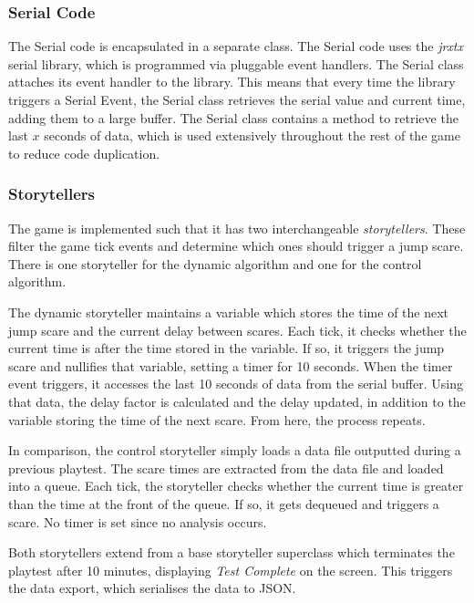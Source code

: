 \documentclass[12pt,a4paper]{article}\usepackage[]{graphicx}\usepackage[]{color}
\begin{document}
\subsubsection{Serial Code}
The Serial code is encapsulated in a separate class.
The Serial code uses the \emph{jrxtx} serial library, which is programmed via pluggable event handlers.
The Serial class attaches its event handler to the library.
This means that every time the library triggers a Serial Event, the Serial class retrieves the serial value and current time, adding them to a large buffer.
The Serial class contains a method to retrieve the last $x$ seconds of data, which is used extensively throughout the rest of the game to reduce code duplication.

\subsubsection{Storytellers}
The game is implemented such that it has two interchangeable \emph{storytellers}.
These filter the game tick events and determine which ones should trigger a jump scare.
There is one storyteller for the dynamic algorithm and one for the control algorithm.

The dynamic storyteller maintains a variable which stores the time of the next jump scare and the current delay between scares.
Each tick, it checks whether the current time is after the time stored in the variable.
If so, it triggers the jump scare and nullifies that variable, setting a timer for 10 seconds.
When the timer event triggers, it accesses the last 10 seconds of data from the serial buffer.
Using that data, the delay factor is calculated and the delay updated, in addition to the variable storing the time of the next scare.
From here, the process repeats.

In comparison, the control storyteller simply loads a data file outputted during a previous playtest.
The scare times are extracted from the data file and loaded into a queue.
Each tick, the storyteller checks whether the current time is greater than the time at the front of the queue.
If so, it gets dequeued and triggers a scare.
No timer is set since no analysis occurs.

Both storytellers extend from a base storyteller superclass which terminates the playtest after 10 minutes, displaying \emph{Test Complete} on the screen.
This triggers the data export, which serialises the data to JSON.
\end{document}
